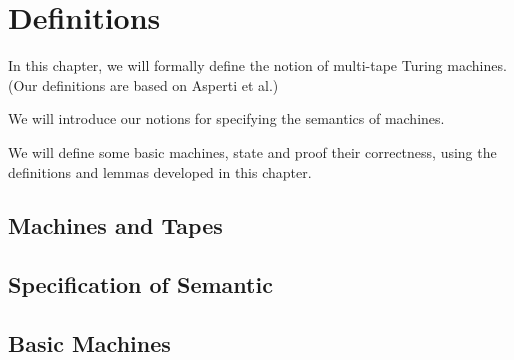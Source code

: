 \chapter{Definitions}
\label{chap:definitions}

In this chapter, we will formally define the notion of multi-tape Turing machines.
(Our definitions are based on Asperti et al.)

We will introduce our notions for specifying the semantics of machines.

We will define some basic machines, state and proof their correctness, using the definitions and lemmas developed in this chapter.

\section{Machines and Tapes}
\label{sec:machine_tapes}

\section{Specification of Semantic}
\label{sec:spec_semantics}

\section{Basic Machines}
\label{sec:basic_machines}

